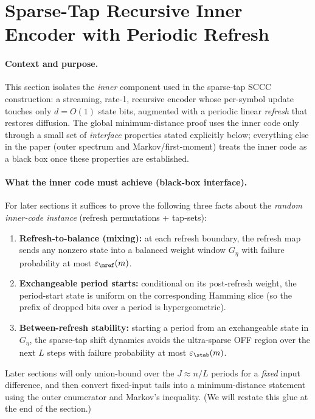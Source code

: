 \section{Sparse-Tap Recursive Inner Encoder with Periodic Refresh}
\label{sec:sparse-refresh-inner}

\paragraph{Context and purpose.}
This section isolates the \emph{inner} component used in the sparse-tap SCCC construction: a
streaming, rate-1, recursive encoder whose per-symbol update touches only \(d=O(1)\) state bits,
augmented with a periodic linear \emph{refresh} that restores diffusion.
The global minimum-distance proof uses the inner code only through a small set of \emph{interface}
properties stated explicitly below; everything else in the paper (outer spectrum and Markov/first-moment)
treats the inner code as a black box once these properties are established.

\paragraph{What the inner code must achieve (black-box interface).}
For later sections it suffices to prove the following three facts about the \emph{random inner-code instance}
(refresh permutations + tap-sets):
\begin{enumerate}
\item \textbf{Refresh-to-balance (mixing):} at each refresh boundary, the refresh map sends any nonzero state into a
balanced weight window \(G_\eta\) with failure probability at most \(\varepsilon_{\mref}(m)\).
\item \textbf{Exchangeable period starts:} conditional on its post-refresh weight, the period-start state is uniform on the
corresponding Hamming slice (so the prefix of dropped bits over a period is hypergeometric).
\item \textbf{Between-refresh stability:} starting a period from an exchangeable state in \(G_\eta\), the sparse-tap shift
dynamics avoids the ultra-sparse OFF region over the next \(L\) steps with failure probability at most \(\varepsilon_{\stab}(m)\).
\end{enumerate}
Later sections will only union-bound over the \(J\approx n/L\) periods for a \emph{fixed} input difference,
and then convert fixed-input tails into a minimum-distance statement using the outer enumerator and Markov’s inequality.
(We will restate this glue at the end of the section.)

